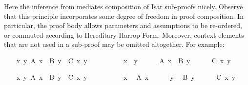 \begin{isabellebody}
%
\endisatagproof
{\isafoldproof}%
%
\isadelimproof
%
\endisadelimproof
%
\endgroup
%
\begin{isamarkuptext}%
\noindent Here the \hyperlink{inference.refinement}{\mbox{}} inference from
   mediates composition of Isar
  sub-proofs nicely.  Observe that this principle incorporates some
  degree of freedom in proof composition.  In particular, the proof
  body allows parameters and assumptions to be re-ordered, or commuted
  according to Hereditary Harrop Form.  Moreover, context elements
  that are not used in a sub-proof may be omitted altogether.  For
  example:%
\end{isamarkuptext}%
\isamarkuptrue%
%
\begin{minipage}{0.5\textwidth}
%
\isadelimproof
%
\endisadelimproof
%
\isatagproof
\ \ \isamarkupfalse%
\ {\isachardoublequoteopen}{\isasymAnd}x\ y{\isachardot}\ A\ x\ {\isasymLongrightarrow}\ B\ y\ {\isasymLongrightarrow}\ C\ x\ y{\isachardoublequoteclose}\isanewline
\ \ \isamarkupfalse%
\ {\isacharminus}\isanewline
\ \ \ \ \isamarkupfalse%
\ x\ \ y\isanewline
\ \ \ \ \isamarkupfalse%
\ {\isachardoublequoteopen}A\ x{\isachardoublequoteclose}\ \ {\isachardoublequoteopen}B\ y{\isachardoublequoteclose}\isanewline
\ \ \ \ \isamarkupfalse%
\ {\isachardoublequoteopen}C\ x\ y{\isachardoublequoteclose}%
\endisatagproof
{\isafoldproof}%
%
\isadelimproof
%
\endisadelimproof
%
\isadelimnoproof
\ %
\endisadelimnoproof
%
\isatagnoproof
{}\isamarkupfalse%
%
\endisatagnoproof
{\isafoldnoproof}%
%
\isadelimnoproof
\isanewline
%
\endisadelimnoproof
%
\isadelimproof
\ \ %
\endisadelimproof
%
\isatagproof
{}\isamarkupfalse%
%
\end{minipage}\begin{minipage}{0.5\textwidth}
\ \ \isamarkupfalse%
\ {\isachardoublequoteopen}{\isasymAnd}x\ y{\isachardot}\ A\ x\ {\isasymLongrightarrow}\ B\ y\ {\isasymLongrightarrow}\ C\ x\ y{\isachardoublequoteclose}\isanewline
\ \ \isamarkupfalse%
\ {\isacharminus}\isanewline
\ \ \ \ \isamarkupfalse%
\ x\ \isamarkupfalse%
\ {\isachardoublequoteopen}A\ x{\isachardoublequoteclose}\isanewline
\ \ \ \ \isamarkupfalse%
\ y\ \isamarkupfalse%
\ {\isachardoublequoteopen}B\ y{\isachardoublequoteclose}\isanewline
\ \ \ \ \isamarkupfalse%
\ {\isachardoublequoteopen}C\ x\ y{\isachardoublequoteclose}%

\end{minipage}
\end{isabellebody}
